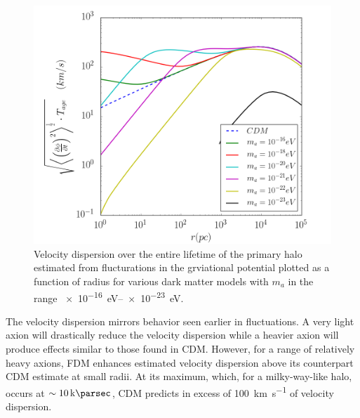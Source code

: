 \documentclass[usenatbib]{mnras}
\begin{document}
\begin{figure}
\includegraphics[width=\columnwidth]{Random_Walk_Velocity_Fluctation.png}
\vspace*{-5mm}
\caption{Velocity dispersion over the entire lifetime of the primary halo estimated from flucturations in the grviational potential plotted as a function of radius for various dark matter models with $m_a$ in the range \SIrange{e-16}{e-23}{\electronvolt}.}

\label{fig:fourierfluc}
\end{figure}
 
\par
The velocity dispersion mirrors behavior seen earlier in fluctuations. A very light axion will drastically reduce the velocity dispersion while a heavier axion will produce effects similar to those found in CDM. However, for a range of relatively heavy axions, FDM enhances estimated velocity dispersion above its counterpart CDM estimate at small radii. At its maximum, which, for a milky-way-like halo, occurs at $\sim \SI{10}{\kilo\parsec}$, CDM predicts in excess of \SI{100}{\kilo\meter\per\second} of velocity dispersion.
	
\par 
\end{document}
